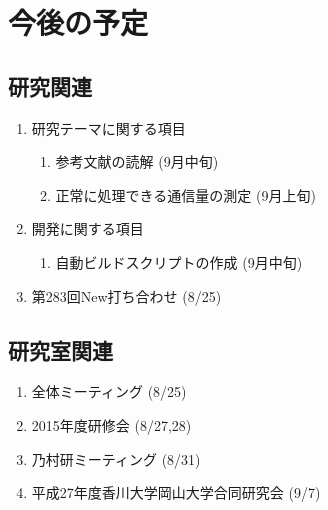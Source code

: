 \documentclass[fleqn, 14pt]{extarticle}
\begin{document}
    \section{今後の予定}
    \label{sec-4}

    \subsection{研究関連}
    \label{sec-4-1}

    \begin{enumerate}

        \item 研究テーマに関する項目
            \hfill
            \begin{enumerate}

                \item 参考文献の読解
                    \hfill
                    (9月中旬)

                \item 正常に処理できる通信量の測定
                    \hfill
                    (9月上旬)

            \end{enumerate}

        \item 開発に関する項目
            \hfill
            \begin{enumerate}

                \item 自動ビルドスクリプトの作成
                    \hfill
                    (9月中旬)

            \end{enumerate}

        \item 第283回New打ち合わせ
            \hfill
            \label{enum-7}
            (8/25)

    \end{enumerate}

    \subsection{研究室関連}
    \label{sec-4-2}

    \begin{enumerate}

        \item 全体ミーティング
            \hfill
            \label{enum-18}
            (8/25)

        \item 2015年度研修会
            \hfill
            \label{enum-18}
            (8/27,28)

        \item 乃村研ミーティング 
            \hfill
            \label{enum-18}
            (8/31)

        \item 平成27年度香川大学岡山大学合同研究会
            \hfill
            \label{enum-18}
            (9/7)
    \end{enumerate}
\end{document}
